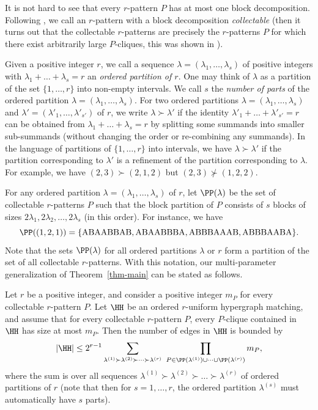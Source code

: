 It is not hard to see that every $r$-pattern $P$ has at most one block decomposition. Following \cite{DGR}, we call an $r$-pattern with a block decomposition \emph{collectable} (then it turns out that the collectable $r$-patterns are precisely the $r$-patterns $P$ for which there exist arbitrarily large $P$-cliques, this was shown in \cite{DGR}).

Given a positive integer $r$, we call a sequence $\lambda=(\lambda_1,\dots,\lambda_s)$ of positive integers with $\lambda_1+\dots+\lambda_s=r$ an \emph{ordered partition of $r$}. One may think of $\lambda$ as a partition of the set $\{1,\dots,r\}$ into non-empty intervals. We call $s$ the \emph{number of parts} of the ordered partition $\lambda=(\lambda_1,\dots,\lambda_s)$. For two ordered partitions $\lambda=(\lambda_1,\dots,\lambda_s)$ and $\lambda'=(\lambda'_1,\dots,\lambda'_{s'})$ of $r$, we write $\lambda \succ \lambda'$ if the identity $\lambda'_1+\dots+\lambda'_{s'}=r$ can be obtained from $\lambda_1+\dots+\lambda_s=r$ by splitting some summands into smaller sub-summands (without changing the order or re-combining any summands). In the language of partitions of $\{1,\dots,r\}$ into intervals, we have $\lambda \succ \lambda'$ if the partition corresponding to $\lambda'$ is a refinement of the partition corresponding to $\lambda$. For example, we have $(2,3) \succ (2,1,2)$ but $(2,3) \not\succ (1,2,2)$.

For any ordered partition $\lambda=(\lambda_1,\dots,\lambda_s)$ of $r$, let $\PP(\lambda)$ be the set of collectable $r$-patterns $P$ such that the block partition of $P$ consists of $s$ blocks of sizes $2\lambda_1,2\lambda_2,\dots,2\lambda_s$ (in this order). For instance, we have 
\[
\PP((1,2,1)) = \{\rm{ABAABBAB, ABAABBBA, ABBBAAAB, ABBBAABA}\}.
\]
Note that the sets $\PP(\lambda)$ for all ordered partitions $\lambda$ or $r$ form a partition of the set of all collectable $r$-patterns.
With this notation, our multi-parameter generalization of Theorem~\ref{thm-main} can be stated as follows. 

\begin{theorem} \label{thm-paramteters-upper-bound}
Let $r$ be a positive integer, and consider a positive integer $m_P$ for every collectable $r$-pattern $P$. Let $\HH$ be an ordered $r$-uniform hypergraph matching, and assume that for every collectable $r$-pattern $P$, every $P$-clique contained in $\HH$ has size at most $m_P$. Then the number of edges in $\HH$ is bounded by
\begin{equation}\label{eq_main_upper}
|\HH|\le 2^{r-1} \sum_{\lambda^{(1)} \succ \lambda^{(2)} \succ \dots \succ \lambda^{(r)}}\ \prod_{P\in \PP(\lambda^{(1)})\cup\dots\cup \PP(\lambda^{(r)})} m_{P},
\end{equation}
where the sum is over all sequences $\lambda^{(1)} \succ \lambda^{(2)} \succ \dots \succ \lambda^{(r)}$ of ordered partitions of $r$ (note that then for $s=1,\dots,r$, the ordered partition $\lambda^{(s)}$ must automatically have $s$ parts).
\end{theorem}


